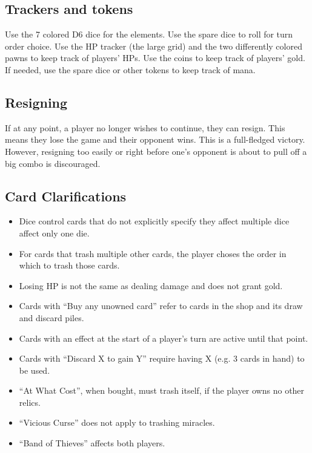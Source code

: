 \documentclass[dvipsnames,parskip,a4paper]{scrartcl}
\begin{document}
\subsection*{Trackers and tokens}

Use the 7 colored D6 dice for the elements. Use the spare dice to roll for turn order choice. Use the HP tracker (the large grid) and the two differently colored pawns to keep track of players' HPs. Use the coins to keep track of players' gold. If needed, use the spare dice or other tokens to keep track of mana.

\subsection*{Resigning}

If at any point, a player no longer wishes to continue, they can resign. This means they lose the game and their opponent wins. This is a full-fledged victory. However, resigning too easily or right before one's opponent is about to pull off a big combo is discouraged.

\subsection*{Card Clarifications}

\begin{itemize}
\item Dice control cards that do not explicitly specify they affect multiple dice affect only one die.
\item For cards that trash multiple other cards, the player choses the order in which to trash those cards.
\item Losing HP is not the same as dealing damage and does not grant gold.
\item Cards with ``Buy any unowned card'' refer to cards in the shop and its draw and discard piles.
\item Cards with an effect at the start of a player's turn are active until that point.
\item Cards with ``Discard X to gain Y'' require having X (e.g. 3 cards in hand) to be used.
\item ``At What Cost'', when bought, must trash itself, if the player owns no other relics.
\item ``Vicious Curse'' does not apply to trashing miracles.
\item ``Band of Thieves'' affects both players.
\end{itemize}
\end{document}
